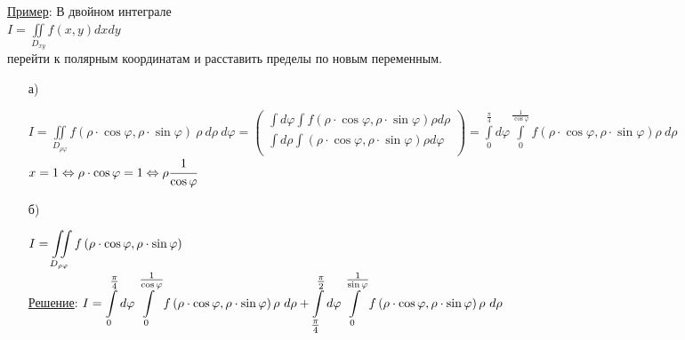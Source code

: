 \underline{Пример}: В двойном интеграле \\
$\displaystyle  I = \iint\limits_{D_{xy}} f(x,y) dxdy$ \\
перейти к полярным координатам и расставить пределы по новым переменным. \\
\begin{enumerate}
\item[а)] 

$\displaystyle  I = \iint\limits_{D_{\rho \varphi}} f (\rho \cdot \cos{\varphi}, \rho \cdot \sin{\varphi}) \  \rho \ d\rho \ d\varphi = \left(
\begin{array}{lll}
	\int d\varphi \int f(\rho \cdot \cos{\varphi}, \rho \cdot \sin{\varphi}) \rho d\rho \\
	\int d\rho \int (\rho \cdot \cos{\varphi}, \rho \cdot \sin{\varphi}) \rho d\varphi \\
\end{array} \right) = 
\int\limits_{0}^{\tfrac{\pi}{4}} d\varphi \int\limits_{0}^{\tfrac{1}{\cos{\varphi}}} f (\rho \cdot \cos{\varphi}, \rho \cdot \sin{\varphi}) \rho \ d\rho$ \\
$x = 1 \Leftrightarrow \rho \cdot \cos{\varphi} = 1 \Leftrightarrow \rho \cfrac{1}{\cos{\varphi}}$ \\



\item[б)] 

$\displaystyle  I = \iint\limits_{D_{\rho \varphi}} f \left(\rho \cdot \cos{\varphi}, \rho \cdot \sin{\varphi} \right) $ \\
\underline{Решение}: 
$\displaystyle  I = \int\limits_{0}^{\tfrac{\pi}{4}} d\varphi \int\limits_{0}^{\tfrac{1}{\cos{\varphi}}} \polarFunction \rho \ d\rho + \int\limits_{\tfrac{\pi}{4}}^{\tfrac{\pi}{2}} d\varphi \int\limits_{0}^{\tfrac{1}{\sin{\varphi}}} \polarFunction \rho \ d\rho$ \\


\end{enumerate}
